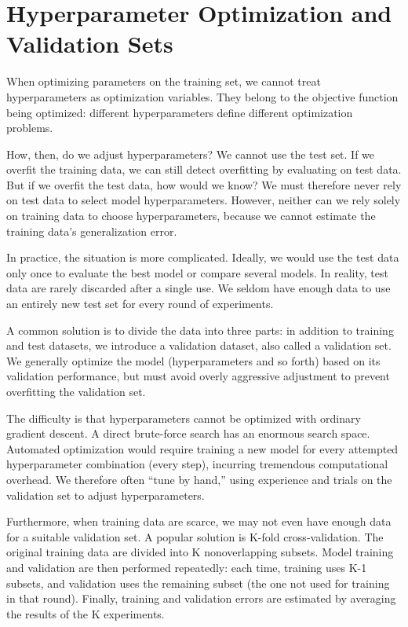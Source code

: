 \setcounter{section}{1}

\hypertarget{hyperparameter-optimization-and-validation-sets}{%
\section{Hyperparameter Optimization and Validation Sets}\label{hyperparameter-optimization-and-validation-sets}}

When optimizing parameters on the training set, we cannot treat hyperparameters as optimization variables. They belong to the objective function being optimized: different hyperparameters define different optimization problems.

How, then, do we adjust hyperparameters? We cannot use the test set. If we overfit the training data, we can still detect overfitting by evaluating on test data. But if we overfit the test data, how would we know? We must therefore never rely on test data to select model hyperparameters. However, neither can we rely solely on training data to choose hyperparameters, because we cannot estimate the training data's generalization error.

In practice, the situation is more complicated. Ideally, we would use the test data only once to evaluate the best model or compare several models. In reality, test data are rarely discarded after a single use. We seldom have enough data to use an entirely new test set for every round of experiments.

A common solution is to divide the data into three parts: in addition to training and test datasets, we introduce a validation dataset, also called a validation set. We generally optimize the model (hyperparameters and so forth) based on its validation performance, but must avoid overly aggressive adjustment to prevent overfitting the validation set.

The difficulty is that hyperparameters cannot be optimized with ordinary gradient descent. A direct brute-force search has an enormous search space. Automated optimization would require training a new model for every attempted hyperparameter combination (every step), incurring tremendous computational overhead. We therefore often ``tune by hand,'' using experience and trials on the validation set to adjust hyperparameters.

Furthermore, when training data are scarce, we may not even have enough data for a suitable validation set. A popular solution is K-fold cross-validation. The original training data are divided into K nonoverlapping subsets. Model training and validation are then performed repeatedly: each time, training uses K-1 subsets, and validation uses the remaining subset (the one not used for training in that round). Finally, training and validation errors are estimated by averaging the results of the K experiments.

